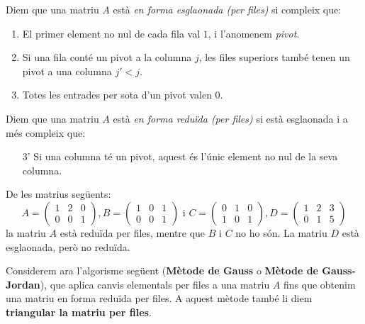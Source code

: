 \begin{definicio}
	Diem que una matriu $A$ està \emph{en forma esglaonada (per files)} si compleix que:
	\begin{enumerate}
		\item El primer element no nul de cada fila val $1$, i l'anomenem \emph{pivot}.
		\item Si una fila conté un pivot a la columna $j$, les files superiors també tenen un pivot a una columna $j'<j$.
		\item Totes les entrades per sota d'un pivot valen $0$.
	\end{enumerate}
	
	Diem que una matriu $A$ està \emph{en forma reduïda (per files)} si està esglaonada i a més compleix que:
	\begin{enumerate}
		\item[3'] Si una columna té un pivot, aquest és l'únic element no nul de la seva columna.
	\end{enumerate}
\end{definicio}
\begin{exemple}
	De les matrius següents:
	\[
	A=\begin{pmatrix}
	1 & 2 & 0 \\ 0 & 0 & 1
	\end{pmatrix},
	B=\begin{pmatrix}
	1 & 0 & 1 \\ 0 & 0 & 1
	\end{pmatrix} \text{ i }
	C=\begin{pmatrix}
	0 & 1 & 0 \\ 1 & 0 & 1
	\end{pmatrix} ,
	D = \begin{pmatrix}
	1&2&3\\
	0&1&5
	\end{pmatrix}
	\]
	la matriu $A$ està reduïda per files, mentre que $B$ i $C$ no ho són. La matriu $D$ està esglaonada, però no reduïda.
\end{exemple}
Considerem ara l'algorisme següent (\textbf{Mètode de Gauss} o \textbf{Mètode de Gauss-Jordan}), que aplica canvis elementals per files a una matriu $A$ fins que obtenim una matriu en forma reduïda per files. A aquest mètode també li diem \textbf{triangular la matriu per files}.

